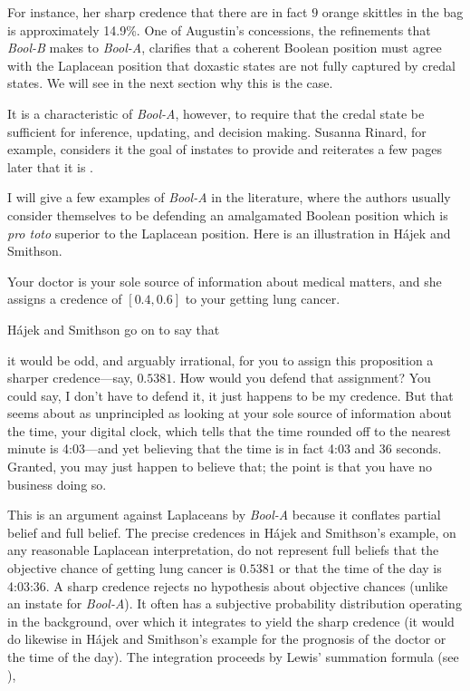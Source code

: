 \documentclass[11pt]{article}
\newcommand{\anderson}[0]{\textit{Bool-A}}
\newcommand{\augustin}[0]{\textit{Bool-B}}
\begin{document}
For instance, her sharp credence that there are in fact $9$ orange
skittles in the bag is approximately 14.9\%. One of Augustin's
concessions, the refinements that {\augustin} makes to {\anderson},
clarifies that a coherent Boolean position must agree with the
Laplacean position that doxastic states are not fully captured by
credal states. We will see in the next section why this is the case.

It is a characteristic of {\anderson}, however, to require that
the credal state be sufficient for inference, updating, and decision
making. Susanna Rinard, for example, considers it the goal of instates
to provide   and reiterates a few pages later
that it is 
.

I will give a few examples of {\anderson} in the literature, where the
authors usually consider themselves to be defending an amalgamated
Boolean position which is \emph{pro toto} superior to the Laplacean
position. Here is an illustration in H{\'a}jek and Smithson.

\begin{quotex}
  \label{ex:crude} Your doctor is your
  sole source of information about medical matters, and she assigns a
  credence of $[0.4,0.6]$ to your getting lung cancer.
\end{quotex}

H{\'a}jek and Smithson go on to say that 

\begin{quotex}
  it would be odd, and arguably irrational, for you to assign this
  proposition a sharper credence---say, $0.5381$. How would you defend
  that assignment? You could say, I don't have to defend it, it just
  happens to be my credence. But that seems about as unprincipled as
  looking at your sole source of information about the time, your
  digital clock, which tells that the time rounded off to the nearest
  minute is 4:03---and yet believing that the time is in fact 4:03 and
  36 seconds. Granted, you may just happen to believe that; the point
  is that you have no business doing so.
\end{quotex}

This is an argument against Laplaceans by {\anderson} because it
conflates partial belief and full belief. The precise credences in
H{\'a}jek and Smithson's example, on any reasonable Laplacean
interpretation, do not represent full beliefs that the objective
chance of getting lung cancer is $0.5381$ or that the time of the day
is 4:03:36. A sharp credence rejects no hypothesis about objective
chances (unlike an instate for {\anderson}). It often has a subjective
probability distribution operating in the background, over which it
integrates to yield the sharp credence (it would do likewise in
H{\'a}jek and Smithson's example for the prognosis of the doctor or
the time of the day). The integration proceeds by Lewis'
summation formula (see ),
\end{document}
